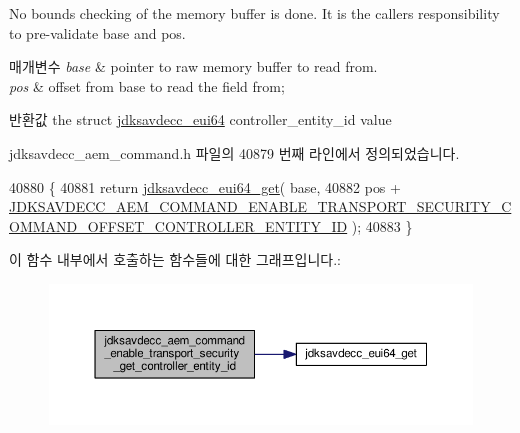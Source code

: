 No bounds checking of the memory buffer is done. It is the caller\textquotesingle{}s responsibility to pre-\/validate base and pos.


\begin{DoxyParams}{매개변수}
{\em base} & pointer to raw memory buffer to read from. \\
\hline
{\em pos} & offset from base to read the field from; \\
\hline
\end{DoxyParams}
\begin{DoxyReturn}{반환값}
the struct \hyperlink{structjdksavdecc__eui64}{jdksavdecc\+\_\+eui64} controller\+\_\+entity\+\_\+id value 
\end{DoxyReturn}


jdksavdecc\+\_\+aem\+\_\+command.\+h 파일의 40879 번째 라인에서 정의되었습니다.


\begin{DoxyCode}
40880 \{
40881     \textcolor{keywordflow}{return} \hyperlink{group__eui64_ga2652311a25a6b91cddbed75c108c7031}{jdksavdecc\_eui64\_get}( base,
40882                                  pos + 
      \hyperlink{group__command__enable__transport__security_ga0f4b8fb28d03dcd55e740d9dc352c0ab}{JDKSAVDECC\_AEM\_COMMAND\_ENABLE\_TRANSPORT\_SECURITY\_COMMAND\_OFFSET\_CONTROLLER\_ENTITY\_ID}
       );
40883 \}
\end{DoxyCode}


이 함수 내부에서 호출하는 함수들에 대한 그래프입니다.\+:
\nopagebreak
\begin{figure}[H]
\begin{center}
\leavevmode
\includegraphics[width=350pt]{group__command__enable__transport__security_ga0642c73dd99b06305e370d1228604374_cgraph}
\end{center}
\end{figure}


